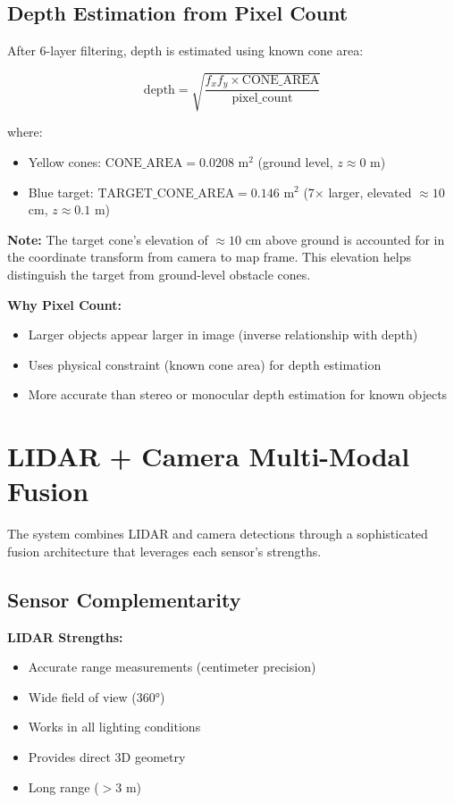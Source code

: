 \documentclass[11pt]{article}
\begin{document}
\subsection{Depth Estimation from Pixel Count}

After 6-layer filtering, depth is estimated using known cone area:

\[
\text{depth} = \sqrt{\frac{f_x f_y \times \text{CONE\_AREA}}{\text{pixel\_count}}}
\]

where:
\begin{itemize}
    \item Yellow cones: $\text{CONE\_AREA} = 0.0208$ m$^2$ (ground level, $z \approx 0$ m)
    \item Blue target: $\text{TARGET\_CONE\_AREA} = 0.146$ m$^2$ (7$\times$ larger, elevated $\approx 10$ cm, $z \approx 0.1$ m)
\end{itemize}

\textbf{Note:} The target cone's elevation of $\approx 10$ cm above ground is accounted for in the coordinate transform from camera to map frame. This elevation helps distinguish the target from ground-level obstacle cones.

\textbf{Why Pixel Count:}
\begin{itemize}
    \item Larger objects appear larger in image (inverse relationship with depth)
    \item Uses physical constraint (known cone area) for depth estimation
    \item More accurate than stereo or monocular depth estimation for known objects
\end{itemize}

\section{LIDAR + Camera Multi-Modal Fusion}

The system combines LIDAR and camera detections through a sophisticated fusion architecture that leverages each sensor's strengths.

\subsection{Sensor Complementarity}

\textbf{LIDAR Strengths:}
\begin{itemize}
    \item Accurate range measurements (centimeter precision)
    \item Wide field of view (360°)
    \item Works in all lighting conditions
    \item Provides direct 3D geometry
    \item Long range ($> 3$ m)
\end{itemize}
\end{document}
